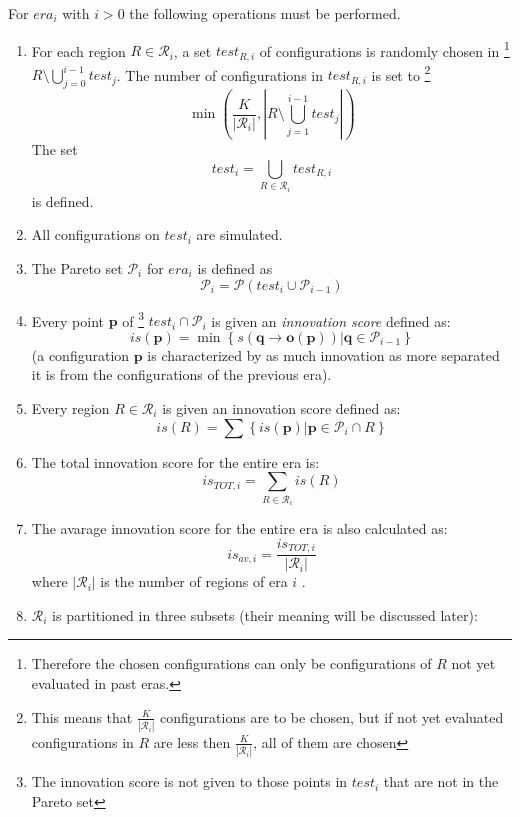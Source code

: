 For $era_{i}$ with $i>0$ the following operations must be performed.
\begin{enumerate}
\item \label{pers02.enu:K}For each region $R\in\mathcal{R}_{i}$, a set
$test_{R,i}$ of configurations is randomly chosen in%
\footnote{Therefore the chosen configurations can only be configurations of
$R$ not yet evaluated in past eras.%
} $R\setminus\bigcup_{j=0}^{i-1}test_{j}$. The number of configurations
in $test_{R,i}$ is set to%
\footnote{This means that $\frac{K}{\left|\mathcal{R}_{i}\right|}$ configurations
are to be chosen, but if not yet evaluated configurations in $R$
are less then $\frac{K}{\left|\mathcal{R}_{i}\right|}$, all of them
are chosen%
} 
\[
\min\left(\frac{K}{\left|\mathcal{R}_{i}\right|},\left|R\setminus\bigcup_{j=1}^{i-1}test_{j}\right|\right)
\]
The set 
\[
test_{i}=\bigcup_{R\in\mathcal{R}_{i}}test_{R,i}
\]
 is defined. 
\item All configurations on $test_{i}$ are simulated.
\item The Pareto set $\mathscr{P}_{i}$ for $era_{i}$ is defined as 
\[
\mathscr{P}_{i}=\mathscr{P}\left(test_{i}\cup\mathscr{P}_{i-1}\right)
\]

\item \label{pers02.enu:novelty_score_of_a_configuration}Every point $\mathbf{p}$
of%
\footnote{The innovation score is not given to those points in $test_{i}$ that
are not in the Pareto set%
} $test_{i}\cap\mathscr{P}_{i}$ is given an \emph{innovation score
}defined as:
\[
is\left(\mathbf{p}\right)=\min\left\{ \left.s\left(\mathbf{q}\rightarrow\mathbf{o}\left(\mathbf{p}\right)\right)\right|\mathbf{q}\in\mathscr{P}_{i-1}\right\} 
\]
 (a configuration $\mathbf{p}$ is characterized by as much innovation
as more separated it is from the configurations of the previous era)\@.
\item Every region $R\in\mathcal{R}_{i}$ is given an innovation score defined
as:
\[
is\left(R\right)=\sum\left\{ \left.is\left(\mathbf{p}\right)\right|\mathbf{p}\in\mathscr{P}_{i}\cap R\right\} 
\]

\item The total innovation score for the entire era is:
\[
is_{TOT,i}=\sum_{R\in\mathcal{R}_{i}}is\left(R\right)
\]

\item The avarage innovation score for the entire era is also calculated
as:
\[
is_{av,i}=\frac{is_{TOT,i}}{\left|\mathcal{R}_{i}\right|}
\]
where $\left|\mathcal{R}_{i}\right|$ is the number of regions of
era $i$ .
\item $\mathcal{R}_{i}$ is partitioned in three subsets (their meaning
will be discussed later):


\end{enumerate}

